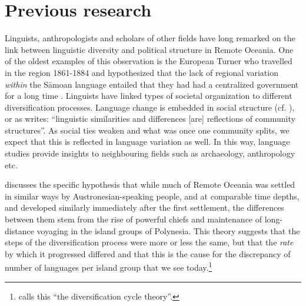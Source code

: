 \documentclass[unnumsec,webpdf,modern,medium]{oup-authoring-template}
\begin{document}

\FloatBarrier
\section{Previous research}
\label{sec:previous_research}
Linguists, anthropologists and scholars of other fields have long remarked on the link between linguistic diversity and political structure in Remote Oceania. One of the oldest examples of this observation is the European Turner who travelled in the region 1861-1884 and hypothesized that the lack of regional variation \emph{within} the S\={a}moan language entailed that they had had a centralized government for a long time \citep[172]{turner1884}. Linguists have linked types of societal organization to different diversification processes. Language change is embedded in social structure (cf. \citep{WLH1968}), or as \citet[124]{grace_1992_aberrant} writes: ``linguistic similarities and differences [are] reflections of community structures''. As social ties weaken and what was once one community splits, we expect that this is reflected in language variation as well. In this way, language studies provide insights to neighbouring fields such as archaeology, anthropology etc.

\citet{pawley81, pawley2007} discusses the specific hypothesis that while much of Remote Oceania was settled in similar ways by Austronesian-speaking people, and at comparable time depths, and developed similarly immediately after the first settlement, the differences between them stem from the rise of powerful chiefs and maintenance of long-distance voyaging in the island groups of Polynesia. This theory suggests that the steps of the diversification process were more or less the same, but that the \emph{rate} by which it progressed differed and that this is the cause for the discrepancy of number of languages per island group that we see today.\footnote{\citet{lynch1981melanesian} calls this ``the diversification cycle theory''.} 


\end{document}

